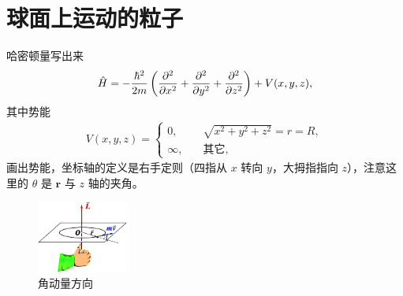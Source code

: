 \section{球面上运动的粒子}
哈密顿量写出来
\begin{align}
    \hat H = -\frac{\hbar^2}{2m} \left(\pdv[2]x + \pdv[2]y + \pdv[2]z\right) + V(x,y,z),
\end{align}
其中势能
\begin{align}
    V(x,y,z) = \begin{cases}
        0, \quad &\sqrt{x^2+y^2+z^2} = r = R, \\
        \infty, \quad &\text{其它},
    \end{cases}
\end{align}
画出势能，坐标轴的定义是右手定则（四指从 $x$ 转向 $y$，大拇指指向 $z$），注意这里的 $\theta$ 是 $\bm r$ 与 $z$ 轴的夹角。
\begin{figure}
    \centering
    \includegraphics[width=3cm]{fig/angular_momentum.png}
    \caption{角动量方向}
    \label{fig:ang_direction}
\end{figure}


